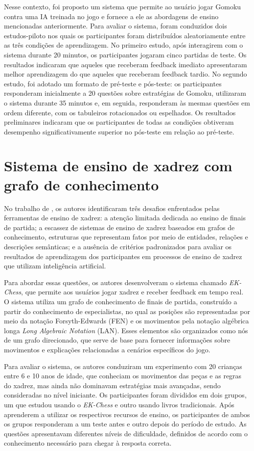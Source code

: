 Nesse contexto, foi proposto um sistema que permite ao usuário jogar Gomoku contra uma IA treinada no jogo e fornece a ele as abordagens de 
ensino mencionadas anteriormente. Para avaliar o sistema, foram conduzidos dois estudos-piloto nos quais os participantes foram distribuídos 
aleatoriamente entre as três condições de aprendizagem. No primeiro estudo, após interagirem com o sistema durante 20 minutos, os 
participantes jogaram cinco partidas de teste. Os resultados indicaram que aqueles que receberam feedback imediato apresentaram melhor 
aprendizagem do que aqueles que receberam feedback tardio. No segundo estudo, foi adotado um formato de pré-teste e pós-teste: os 
participantes responderam inicialmente a 20 questões sobre estratégias de Gomoku, utilizaram o sistema durante 35 minutos e, em seguida, 
responderam às mesmas questões em ordem diferente, com os tabuleiros rotacionados ou espelhados. Os resultados preliminares indicaram que 
os participantes de todas as condições obtiveram desempenho significativamente superior no pós-teste em relação ao pré-teste.

\section{Sistema de ensino de xadrez com grafo de conhecimento}
No trabalho de \cite{EKChess}, os autores identificaram três desafios enfrentados pelas ferramentas de ensino de xadrez: a atenção limitada dedicada ao ensino de finais de partida; a escassez de sistemas de ensino de xadrez baseados em grafos de conhecimento, estruturas que representam fatos por meio de entidades, relações e descrições semânticas; e a ausência de critérios padronizados para avaliar os resultados de aprendizagem dos participantes em processos de ensino de xadrez que utilizam inteligência artificial. 

Para abordar essas questões, os autores desenvolveram o sistema chamado \textit{EK-Chess}, que permite aos usuários jogar xadrez e receber feedback em tempo real. O sistema utiliza um grafo de conhecimento de finais de partida, construído a partir do conhecimento de especialistas,  no qual as posições são representadas por meio da notação Forsyth-Edwards (FEN) e os movimentos pela notação algébrica longa \textit{Long Algebraic Notation} (LAN). Esses elementos são organizados como nós de um grafo direcionado, que serve de base para fornecer informações sobre movimentos e explicações relacionadas a cenários específicos do jogo.

Para avaliar o sistema, os autores conduziram um experimento com 20 crianças entre 6 e 10 anos de idade, que conheciam os movimentos das peças e as regras do xadrez, mas ainda não dominavam estratégias mais avançadas, sendo consideradas no nível iniciante. Os participantes foram divididos em dois grupos, um que estudou usando o \textit{EK-Chess} e outro usando livros tradicionais. Após aprenderem a utilizar os respectivos recursos de ensino, os participantes de ambos os grupos responderam a um teste antes e outro depois do período de estudo. As questões apresentavam diferentes níveis de dificuldade, definidos de acordo com o conhecimento necessário para chegar à resposta correta.

